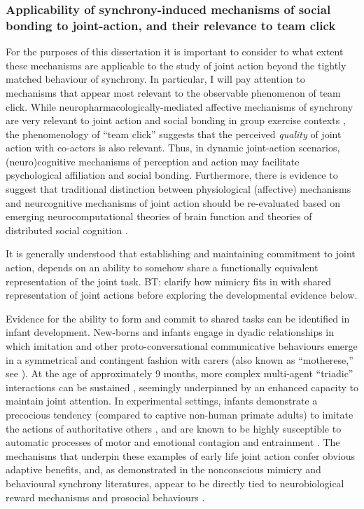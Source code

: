 \begin{CJK}{UTF8}{gbsn}
{\subsubsection{Applicability of synchrony-induced mechanisms of social bonding to joint-action, and their relevance to team click}
For the purposes of this dissertation it is important to consider to what extent these mechanisms are applicable to the study of joint action beyond the tightly matched behaviour of synchrony.  In particular, I will pay attention to mechanisms that appear most relevant to the observable phenomenon of team click. While neuropharmacologically-mediated affective mechanisms of synchrony are very relevant to joint action and social bonding in group exercise contexts \citep[see]{Cohen2009,Sullivan2013,Tarr2015}, the phenomenology of ``team click'' suggests that the perceived \textit{quality} of joint action with co-actors is also relevant.  Thus, in dynamic joint-action scenarios, (neuro)cognitive mechanisms of perception and action may facilitate psychological affiliation and social bonding.  Furthermore, there is evidence to suggest that traditional distinction between physiological (affective) mechanisms and neurcognitive mechanisms of joint action should be re-evaluated based on emerging neurocomputational theories of brain function and theories of distributed social cognition \citep{Pessoa2013,Pessoa2014,Miller2017}.


It is generally understood that establishing and maintaining commitment to joint action, depends on an ability to somehow share a functionally equivalent representation of the joint task\citep{Vesper2010,Michael2016}.  BT: clarify how mimicry fits in with shared representation of joint actions before exploring the developmental evidence below.

Evidence for the ability to form and commit to shared tasks can be identified in infant development.  New-borns and infants engage in dyadic relationships in which imitation and other proto-conversational communicative behaviours emerge in a symmetrical and contingent fashion with carers (also known as ``motherese,'' see \cite{Braten2007}). At the age of approximately 9 months, more complex multi-agent ``triadic'' interactions can be sustained \citep{Colle2008}, seemingly underpinned by an enhanced capacity to maintain joint attention.
In experimental settings, infants demonstrate a precocious tendency (compared to captive non-human primate adults) to imitate the actions of authoritative others \citep{Tomasello2014}, and are known to be highly susceptible to automatic processes of motor and emotional contagion and entrainment \citep{Bargh2012}. The mechanisms that underpin these examples of early life joint action confer obvious adaptive benefits, and, as demonstrated in the nonconscious mimicry and behavioural synchrony literatures, appear to be directly tied to neurobiological reward mechanisms and prosocial behaviours \citep{Hurley2008,Launay2016}.

}
\end{CJK}
